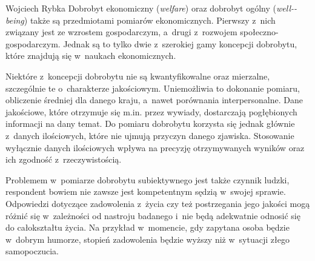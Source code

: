 \begin{artplenv}{Wojciech Rybka}
Dobrobyt ekonomiczny (\textit{welfare}) oraz dobrobyt ogólny (\textit{well-\mbox{-being}}) także są przedmiotami pomiarów
ekonomicznych. Pierwszy z~nich związany jest ze wzrostem gospodarczym, a~drugi z~rozwojem społeczno-gospodarczym.
Jednak są to tylko dwie z~szerokiej gamy koncepcji dobrobytu, które znajdują się w~naukach ekonomicznych.

Niektóre z~koncepcji dobrobytu nie są kwantyfikowalne oraz mierzalne, szczególnie te o~charakterze jakościowym.
Uniemożliwia to dokonanie pomiaru, obliczenie średniej dla danego kraju, a~nawet porównania interpersonalne. Dane
jakościowe, które otrzymuje się m.in. przez wywiady, dostarczają pogłębionych informacji na dany temat. Do pomiaru
dobrobytu korzysta się jednak głównie z~danych ilościowych, które nie ujmują przyczyn danego zjawiska. Stosowanie
wyłącznie danych ilościowych wpływa na precyzję otrzymywanych wyników oraz ich zgodność z~rzeczywistością.

Problemem w~pomiarze dobrobytu subiektywnego jest także czynnik ludzki, respondent bowiem nie zawsze jest kompetentnym
sędzią w~swojej sprawie. Odpowiedzi dotyczące zadowolenia z~życia czy też postrzegania
jego jakości mogą różnić się w~zależności
od nastroju badanego i~nie będą adekwatnie odnosić się do całokształtu życia. Na przykład w~momencie, gdy zapytana
osoba będzie w~dobrym humorze, stopień zadowolenia będzie wyższy niż w~sytuacji złego samopoczucia. 


\end{artplenv}
